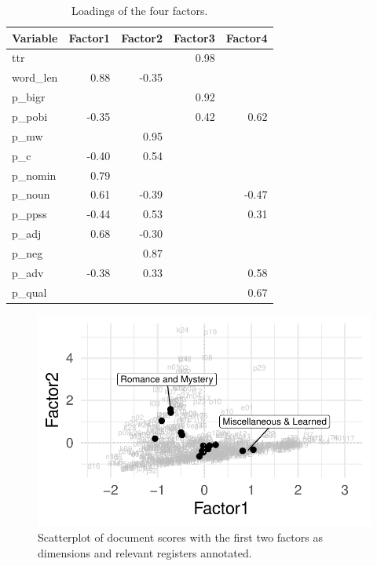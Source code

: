 \documentclass[
  letterpaper,
  DIV=11,
  numbers=noendperiod]{scrartcl}
\begin{document}
\hypertarget{tbl-factors}{}
\begin{table}
\caption{\label{tbl-factors}Loadings of the four factors. }\tabularnewline

\centering\begingroup\fontsize{22}{24}\selectfont

\begin{tabular}[t]{l|r|r|r|r}
\hline
Variable & Factor1 & Factor2 & Factor3 & Factor4\\
\hline
ttr &  &  & 0.98 & \\
\hline
word\_len & 0.88 & -0.35 &  & \\
\hline
p\_bigr &  &  & 0.92 & \\
\hline
p\_pobi & -0.35 &  & 0.42 & 0.62\\
\hline
p\_mw &  & 0.95 &  & \\
\hline
p\_c & -0.40 & 0.54 &  & \\
\hline
p\_nomin & 0.79 &  &  & \\
\hline
p\_noun & 0.61 & -0.39 &  & -0.47\\
\hline
p\_ppss & -0.44 & 0.53 &  & 0.31\\
\hline
p\_adj & 0.68 & -0.30 &  & \\
\hline
p\_neg &  & 0.87 &  & \\
\hline
p\_adv & -0.38 & 0.33 &  & 0.58\\
\hline
p\_qual &  &  &  & 0.67\\
\hline
\end{tabular}
\endgroup{}
\end{table}

\begin{figure}

{\centering \includegraphics{sample-paper_files/figure-pdf/fig-scores-1.pdf}

}

\caption{\label{fig-scores}Scatterplot of document scores with the first
two factors as dimensions and relevant registers annotated.}

\end{figure}
\end{document}
